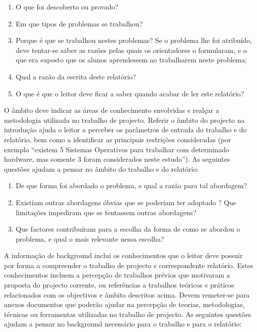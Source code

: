 \begin{enumerate}
 \item O que foi descoberto ou provado?
 \item Em que tipos de problemas se trabalhou?
 \item Porque é que se trabalhou nestes problemas? Se o problema lhe foi atribuído, deve tentar-se saber as razões pelas quais os orientadores o formularam, e o que era suposto que os alunos aprendessem ao trabalharem neste problema;
 \item Qual a razão da escrita deste relatório?
 \item O que é que o leitor deve ficar a saber quando acabar de ler este relatório?
\end{enumerate}


O âmbito deve indicar as áreas de conhecimento envolvidas e realçar a metodologia utilizada no trabalho de projecto. Referir o âmbito do projecto na introdução ajuda o leitor a perceber os parâmetros de entrada do trabalho e do relatório, bem como a identificar as principais restrições consideradas (por exemplo “existem 5 Sistemas Operativos para trabalhar com determinado hardware, mas somente 3 foram considerados neste estudo”). As seguintes questões ajudam a pensar no âmbito do trabalho e do relatório:

\begin{enumerate}
 \item De que forma foi abordado o problema, e qual a razão para tal abordagem?
 \item Existiam outras abordagens óbvias que se poderiam ter adoptado ? Que limitações impediram que se tentassem outras abordagens?
 \item Que factores contribuíram para a escolha da forma de como se abordou o problema, e qual o mais relevante nessa escolha?
\end{enumerate}

A informação de background inclui os conhecimentos que o leitor deve possuir por forma a compreender o trabalho de projecto e correspondente relatório. Estes conhecimentos incluem a percepção de trabalhos prévios que motivaram a proposta do projecto corrente, ou referências a trabalhos teóricos e práticos relacionados com os objectivos e âmbito descritos acima. Devem remeter-se para anexos documentos que poderão ajudar na percepção de teorias, metodologias, técnicas ou ferramentas utilizadas no trabalho de projecto. As seguintes questões ajudam a pensar no background necessário para o trabalho e para o relatório:

